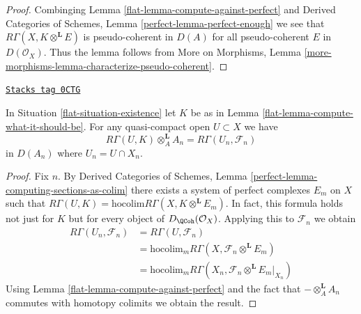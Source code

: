 \begin{proof}

Combinging Lemma \ref{flat-lemma-compute-against-perfect} and
Derived Categories of Schemes, Lemma \ref{perfect-lemma-perfect-enough}
we see that $R\Gamma(X, K \otimes^\mathbf{L} E)$
is pseudo-coherent in $D(A)$ for all pseudo-coherent
$E$ in $D(\mathcal{O}_X)$. Thus the lemma follows from
More on Morphisms, Lemma
\ref{more-morphisms-lemma-characterize-pseudo-coherent}.
\end{proof}

\begin{lemma}
\label{flat-lemma-compute-over-affine}
\href{https://stacks.math.columbia.edu/tag/0CTG}{\texttt{Stacks tag 0CTG}}

In Situation \ref{flat-situation-existence} let $K$ be as in
Lemma \ref{flat-lemma-compute-what-it-should-be}. For any quasi-compact
open $U \subset X$ we have
$$
R\Gamma(U, K) \otimes_A^\mathbf{L} A_n =
R\Gamma(U_n, \mathcal{F}_n)
$$
in $D(A_n)$ where $U_n = U \cap X_n$.
\end{lemma}

\begin{proof}

Fix $n$. By Derived Categories of Schemes, Lemma
\ref{perfect-lemma-computing-sections-as-colim}
there exists a system of perfect complexes $E_m$
on $X$ such that
$R\Gamma(U, K) = \text{hocolim} R\Gamma(X, K \otimes^\mathbf{L} E_m)$.
In fact, this formula holds not just for $K$ but for every object of
$D_\QCoh(\mathcal{O}_X)$.
Applying this to $\mathcal{F}_n$
we obtain
\begin{align*}
R\Gamma(U_n, \mathcal{F}_n)
& =
R\Gamma(U, \mathcal{F}_n) \\
& =
\text{hocolim}_m R\Gamma(X, \mathcal{F}_n \otimes^\mathbf{L} E_m) \\
& =
\text{hocolim}_m R\Gamma(X_n, \mathcal{F}_n \otimes^\mathbf{L} E_m|_{X_n})
\end{align*}
Using Lemma \ref{flat-lemma-compute-against-perfect}
and the fact that $- \otimes_A^\mathbf{L} A_n$
commutes with homotopy colimits we obtain the result.
\end{proof}

